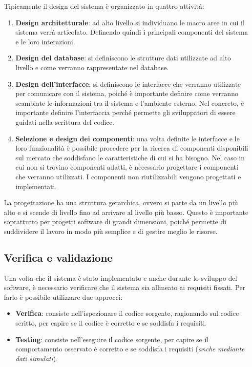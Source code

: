 Tipicamente il design del sistema è organizzato in quattro attività:
\begin{enumerate}
    \item \textbf{Design architetturale}: ad alto livello si individuano le macro 
    aree in cui il sistema verrà articolato. Definendo quindi i principali componenti
    del sistema e le loro interazioni. 
    \item \textbf{Design del database}: si definiscono le strutture dati utilizzate 
    ad alto livello e come 
    verranno rappresentate nel database.
    \item \textbf{Design dell'interfacce}: si definiscono le interfacce che verranno
    utilizzate per comunicare con il sistema, poiché è importante definire come verranno
    scambiate le informazioni tra il sistema e l'ambiente esterno. Nel concreto, è importante 
    definire l'interfaccia perché permette gli sviluppatori di essere guidati nella scrittura
    del codice.
    \item \textbf{Selezione e design dei componenti}: una volta definite le interfacce
    e le loro funzionalità è possibile 
    procedere per la ricerca di componenti disponibili sul mercato che soddisfano 
    le caratteristiche di cui si ha bisogno.
    Nel caso in cui non si trovino componenti adatti, è necessario progettare i componenti
    che verranno utilizzati. 
    I componenti non riutilizzabili vengono progettati e implementati.
\end{enumerate}
La progettazione ha una struttura gerarchica, ovvero si parte da un livello più alto
e si scende di livello fino ad arrivare al livello più basso. Questo è importante 
soprattutto per progetti software di grandi dimensioni, poiché permette di suddividere
il lavoro in modo più semplice e di gestire meglio le risorse.
\subsection{Verifica e validazione}
Una volta che il sistema è stato implementato e anche durante lo sviluppo 
del software, è necessario verificare che il sistema
sia allineato ai requisiti fissati. 
Per farlo è possibile utilizzare due approcci:
\begin{itemize}
    \item \textbf{Verifica}: consiste nell'ispezionare il codice sorgente, ragionando 
    sul codice scritto, per capire se il codice è corretto e se soddisfa i requisiti.
    \item \textbf{Testing}: consiste nell'eseguire il codice sorgente, per capire se
    il comportamento osservato è corretto e se soddisfa i requisiti (\textit{anche 
    mediante dati simulati}).
\end{itemize}

